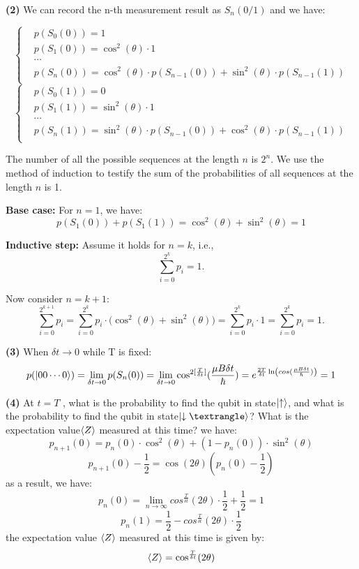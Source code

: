 \documentclass[12pt]{article}
\begin{document}
\textbf{(2)} 
We can record the n-th measurement result as $S_{n}(0/1)$ and we have:

\[
\left\{
\begin{aligned}
    &p(S_{0}(0)) = 1 \\
    &p(S_{1}(0)) = \cos^2(\theta) \cdot 1 \\
    &\cdots \\
    &p(S_{n}(0)) = \cos^2(\theta) \cdot p(S_{n-1}(0)) + \sin^2(\theta) \cdot p(S_{n-1}(1)) \\
\end{aligned}
\right.
\]
\[
\left\{
\begin{aligned}
    &p(S_{0}(1)) = 0 \\
    &p(S_{1}(1)) = \sin^2(\theta) \cdot 1 \\
    &\cdots \\
    &p(S_{n}(1)) = \sin^2(\theta) \cdot p(S_{n-1}(0))+ \cos^2(\theta) \cdot p(S_{n-1}(1)) \\
\end{aligned}
\right.
\]

The number of all the possible sequences at the length $n$ is $2^n$. We use the method of induction to testify the sum of the probabilities of all sequences at the length $n$ is 1.

\textbf{Base case:} For $n=1$, we have:
\[
p(S_{1}(0)) + p(S_{1}(1)) = \cos^2(\theta) + \sin^2(\theta) = 1
\]

\textbf{Inductive step:} Assume it holds for $n=k$, i.e.,
\[
\sum_{i=0}^{2^k} p_i = 1.
\]

Now consider $n = k+1$:
\[
\sum_{i=0}^{2^{k+1}} p_i
= \sum_{i=0}^{2^k} p_i \cdot \bigl(\cos^2(\theta) + \sin^2(\theta)\bigr)
= \sum_{i=0}^{2^k} p_i \cdot 1
= \sum_{i=0}^{2^k} p_i
= 1.
\]

\textbf{(3)} When $\delta t\to 0$ while T is fixed:
\[
p(\ket{00\cdots 0}) = \lim_{\delta t \to 0} p(S_{n}(0)) = \lim_{\delta t \to 0} \cos^{2[\frac{T}{\delta t}]}(\frac{\mu B \delta t}{\hbar}) = e^{\frac{2T}{\delta t}\ln(cos(\frac{\mu B \delta t}{\hbar}))}=1
\]

\textbf{(4)}  At $t = T$ , what is the probability to find the qubit in state$\ket{\uparrow}$, and what is the probability to find the qubit in state$\ket{ \downarrow⟩}$? What is the expectation value$ \braket{Z}$ measured at this time? 
we have:
\[
p_{n+1}(0)=p_{n}(0)\cdot\cos^2(\theta)+(1-p_{n}(0))\cdot \sin^2(\theta) 
\]
\[
p_{n+1}(0)-\frac{1}{2}=\cos(2\theta)(p_{n}(0)-\frac{1}{2})
\]
as a result, we have:
$$p_n(0)=\lim_{n\to \infty}cos^{\frac{T}{\delta t}}(2\theta)\cdot\frac{1}{2}+\frac{1}{2}=1$$
\[
p_n(1)=\frac{1}{2}-cos^{\frac{T}{\delta t}}(2\theta)\cdot\frac{1}{2}
\]
the expectation value $\braket{Z}$ measured at this time is given by:
\[
\braket{Z}=\cos^{\frac{T}{\delta t}}(2\theta)\]
\end{document}
